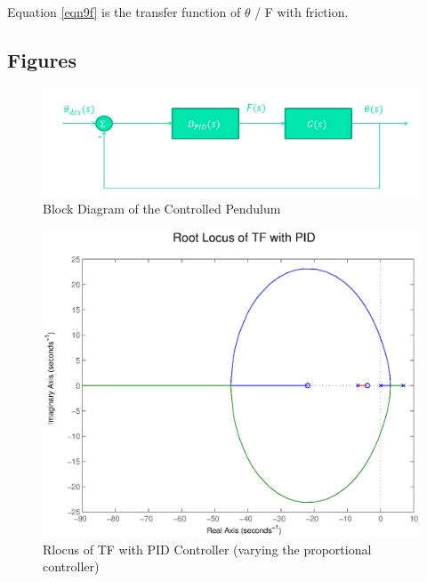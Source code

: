 \documentclass{article}
\begin{document}
Equation \ref{eqn9f} is the transfer function of $\theta$ / F with friction.



\subsection{Figures}

\begin{figure}[!htb]
    \centering
    \includegraphics[scale=0.7]{Block Diagram of Controlled Pendulum}
    \caption{ Block Diagram of the Controlled Pendulum}
\end{figure} 

\begin{figure}[!htb]
    \centering
    \includegraphics[scale=0.6]{1}
    \caption{ Rlocus of TF with PID Controller (varying the proportional controller)}
\end{figure} 
\end{document}
